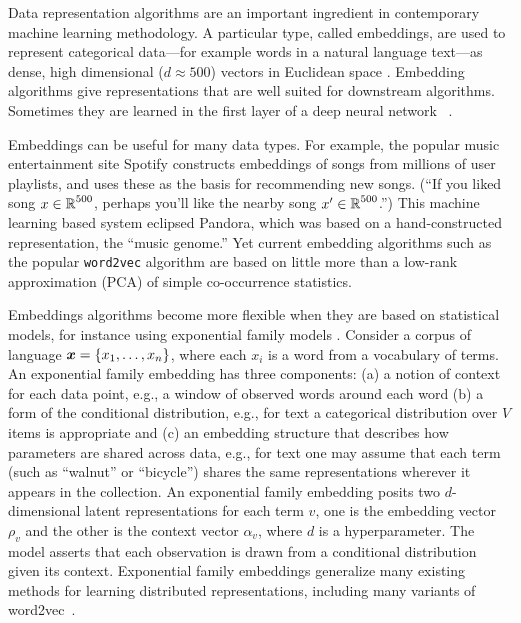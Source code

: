 \statbackground{}
Data representation algorithms are an important ingredient in contemporary
machine learning methodology. A particular type, called embeddings, are used to represent
categorical data---for example words in a natural language text---as
dense, high dimensional ($d\approx 500$) vectors in Euclidean space \citep{Mikolov:2013}.
Embedding algorithms give representations that are well suited for downstream
algorithms. Sometimes they are learned in the first layer of
a deep neural network ~\citep{Bengio:2003}.  

Embeddings can be useful for many data types. For example, the popular
music entertainment site Spotify constructs embeddings of songs from
millions of user playlists, and uses these as the basis for
recommending new songs.  (``If you liked song $x\in\mbox{$\mathbb{R}$}^{500}$,
perhaps you'll like the nearby song $x'\in\mbox{$\mathbb{R}$}^{500}$.'')  This
machine learning based system eclipsed Pandora, which was based on a
hand-constructed representation, the ``music genome.'' Yet current
embedding algorithms such as the popular \texttt{word2vec} algorithm
are based on little more than a low-rank approximation (PCA) of simple
co-occurrence statistics.

Embeddings algorithms become more flexible when they are based
on statistical models, for instance using exponential family
models \citep{Rudolph:2016b,spherical}.
Consider a corpus of language $\boldsymbol{x} = \{x_1, \ldots, x_n\}$, where
each $x_i$ is a word from a vocabulary of terms. An exponential family
embedding has three components: (a) a notion of context for
each data point, e.g., a window of observed words around each word (b)
a form of the conditional distribution, e.g., for text a
categorical distribution over $V$ items is appropriate and (c) an
embedding structure that describes how parameters are shared
across data, e.g., for text one may assume that each term (such as
``walnut'' or ``bicycle'') shares the same representations wherever it
appears in the collection.
An exponential family embedding
posits two $d$-dimensional latent representations for each term $v$,
one is the embedding vector $\rho_v$ and the other is the
context vector $\alpha_v$, where $d$ is a hyperparameter.  The
model asserts that each observation is drawn from a conditional
distribution given its context. 
Exponential family embeddings generalize many existing methods for
learning distributed representations, including 
many variants of word2vec~\citep{Mikolov:2013}.  



